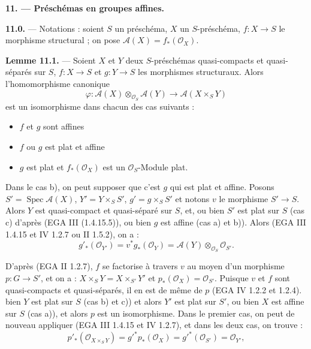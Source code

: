 \documentclass[11pt,a4paper]{article}
\begin{document}
\textbf{11. — Préschémas en groupes affines.}

\textbf{11.0.} — Notations : soient $S$ un préschéma, $X$ un $S$-préschéma,
$f : X \to S$ le morphisme structural ; on pose
$\mathcal{A}(X) = f_{*}(\mathcal{O}_{X})$.

\textbf{Lemme 11.1.} — Soient $X$ et $Y$ deux $S$-préschémas quasi-compacts
et quasi-séparés sur $S$, $f : X \to S$ et $g : Y \to S$ les morphismes
structuraux. Alors l'homomorphisme canonique
\[
\varphi : \mathcal{A}(X) \otimes_{\mathcal{O}_{S}} \mathcal{A}(Y)
\longrightarrow \mathcal{A}(X \times_{S} Y)
\]
est un isomorphisme dans chacun des cas suivants :
\begin{itemize}
\item[a)] $f$ et $g$ sont affines
\item[b)] $f$ ou $g$ est plat et affine
\item[c)] $g$ est plat et $f_{*}(\mathcal{O}_{X})$ est un
$\mathcal{O}_{S}$-Module plat.
\end{itemize}


Dans le cas b), on peut supposer que c'est $g$ qui est plat et affine.
Posons $S' = \operatorname{Spec} \mathcal{A}(X)$, $Y' = Y \times_{S} S'$,
$g' = g \times_{S} S'$ et notons $v$ le morphisme $S' \to S$. Alors $Y$ est
quasi-compact et quasi-séparé sur $S$, et, ou bien $S'$ est plat sur $S$
(cas c) d'après (EGA III (1.4.15.5)), ou bien $g$ est affine (cas a) et
b)). Alors (EGA III 1.4.15 et IV 1.2.7 ou II 1.5.2), on a :
\[
g'_{*}(\mathcal{O}_{Y'}) = v^{*} g_{*}(\mathcal{O}_{Y})
= \mathcal{A}(Y) \otimes_{\mathcal{O}_{S}} \mathcal{O}_{S'} .
\]

D'après (EGA II 1.2.7), $f$ se factorise à travers $v$ au moyen d'un
morphisme $p : G \to S'$, et on a : $X \times_{S} Y = X \times_{S'} Y'$ et
$p_{*}(\mathcal{O}_{X}) = \mathcal{O}_{S'}$. Puisque $v$ et $f$ sont
quasi-compacts et quasi-séparés, \struck{\ill{}} il en est de même de $p$
(EGA IV 1.2.2 et 1.2.4).  bien $Y$ est plat sur $S$ (cas b) et c))
et alors $Y'$ est plat sur $S'$, ou bien $X$ est affine sur $S$ (cas a)),
et alors $p$ est un isomorphisme. Dans le premier cas, on peut de nouveau
appliquer (EGA III 1.4.15 et IV 1.2.7), et dans les deux cas, on trouve :
\struck{\ill{}}
\[
p'_{*}(\mathcal{O}_{X \times_{S} Y}) = g'^{*} p_{*}(\mathcal{O}_{X})
= g'^{*}(\mathcal{O}_{S'}) = \mathcal{O}_{Y'} ,
\]
\end{document}
